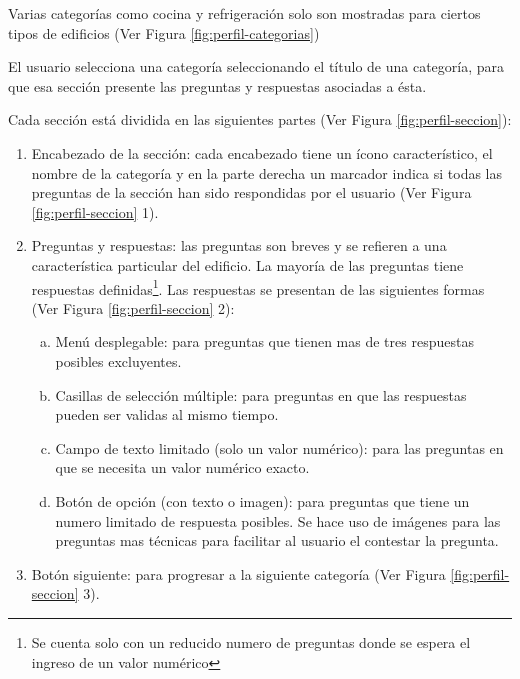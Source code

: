 Varias categorías como cocina y refrigeración solo son mostradas
para ciertos tipos de edificios (Ver Figura \ref{fig:perfil-categorias})


El usuario selecciona una categoría seleccionando el título de una categoría,
para que esa sección presente las preguntas y respuestas asociadas a ésta.

Cada sección está dividida en las siguientes partes (Ver Figura
\ref{fig:perfil-seccion}):
\begin{enumerate}
\item Encabezado de la sección: cada encabezado tiene un ícono característico,
  el nombre de la categoría y en la parte derecha un marcador indica
  si todas las preguntas de la sección han sido respondidas por el usuario
  (Ver Figura \ref{fig:perfil-seccion} 1).
\item Preguntas y respuestas: las preguntas son breves y se refieren a una
  característica particular del edificio. La mayoría de las preguntas
  tiene respuestas definidas\footnote{Se cuenta solo con un reducido numero de
    preguntas donde se espera el ingreso de un valor numérico}. Las respuestas se
  presentan de las siguientes formas (Ver Figura \ref{fig:perfil-seccion} 2):
  \begin{enumerate}[a)]
  \item Menú desplegable: para preguntas que tienen mas de tres respuestas
    posibles excluyentes.
  \item Casillas de selección múltiple: para preguntas en que las respuestas
    pueden ser validas al mismo tiempo.
  \item Campo de texto limitado (solo un valor numérico): para las preguntas
    en que se necesita un valor numérico exacto.
  \item Botón de opción (con texto o imagen): para preguntas que tiene un
    numero limitado de respuesta posibles. Se hace uso de imágenes para las
    preguntas mas técnicas para facilitar al usuario el contestar la pregunta.
  \end{enumerate}
\item Botón siguiente: para progresar a la siguiente categoría (Ver Figura \ref{fig:perfil-seccion} 3).
\end{enumerate}


